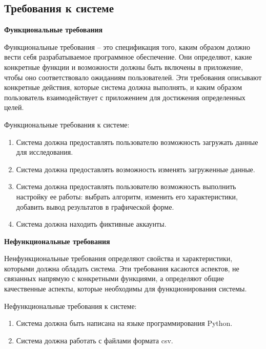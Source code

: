 \subsection{Требования к системе}
\label{subsec:fotmalDefinition}
\textbf{Функциональные требования}

Функциональные требования -- это спецификация того, каким образом должно вести себя разрабатываемое программное обеспечение. Они определяют, какие конкретные функции и возможности должны быть включены в приложение, чтобы оно соответствовало ожиданиям пользователей. Эти требования описывают конкретные действия, которые система должна выполнять, и каким образом пользователь взаимодействует с приложением для достижения определенных целей. 

Функциональные требования к системе:

\begin{enumerate}[itemindent=2cm, leftmargin=0cm, labelsep=0.3cm, topsep=0cm, itemsep=0cm, parsep=0cm, label=\arabic*., after=\vspace{-0.1cm}, before=\vspace{-0.1cm}]
    \item Система должна предоставлять пользователю возможность загружать данные для исследования.
    \item Система должна предоставлять возможность изменять загруженные данные.
    \item Система должна предоставлять пользователю возможность выполнить настройку ее работы: выбрать алгоритм, изменить его характеристики, добавить вывод результатов в графической форме.
    \item Система должна находить фиктивные аккаунты.
\end{enumerate}

\textbf{Нефункциональные требования}

Ненфункциональные требования определяют свойства и характеристики, которыми должна обладать система. Эти требования касаются аспектов, не связанных напрямую с конкретными функциями, а определяют общие качественные аспекты, которые необходимы для функционирования системы.

Нефункциональные требования к системе:

\begin{enumerate}[itemindent=2cm, leftmargin=0cm, labelsep=0.3cm, topsep=0cm, itemsep=0cm, parsep=0cm, label=\arabic*., after=\vspace{-0.1cm}, before=\vspace{-0.1cm}]
    \item Система должна быть написана на языке программирования Python.
    \item Система должна работать с файлами формата csv.
\end{enumerate}

